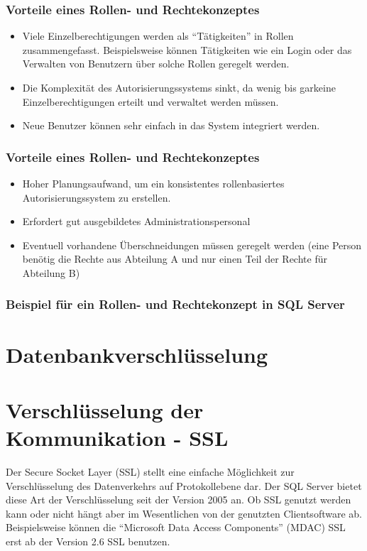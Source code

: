         \subsubsection{Vorteile eines Rollen- und Rechtekonzeptes}
          \begin{itemize}
            \item Viele Einzelberechtigungen werden als \enquote{Tätigkeiten} in
            Rollen zusammengefasst. Beispielsweise können Tätigkeiten wie ein
            Login oder das Verwalten von Benutzern über solche Rollen geregelt
            werden.
            \item Die Komplexität des Autorisierungssystems sinkt, da wenig bis
            garkeine Einzelberechtigungen erteilt und verwaltet werden müssen.
            \item Neue Benutzer können sehr einfach in das System integriert
            werden.
          \end{itemize}
        \subsubsection{Vorteile eines Rollen- und Rechtekonzeptes}
          \begin{itemize}
            \item Hoher Planungsaufwand, um ein konsistentes rollenbasiertes
            Autorisierungssystem zu erstellen.
            \item Erfordert gut ausgebildetes Administrationspersonal
            \item Eventuell vorhandene Überschneidungen müssen geregelt werden
            (eine Person benötig die Rechte aus Abteilung A und nur einen Teil
            der Rechte für Abteilung B)
          \end{itemize}
        \subsubsection{Beispiel für ein Rollen- und Rechtekonzept in SQL Server}
    \section{Datenbankverschlüsselung}
    \section{Verschlüsselung der Kommunikation - SSL}
      Der Secure Socket Layer (SSL) stellt eine einfache Möglichkeit zur
      Verschlüsselung des Datenverkehrs auf Protokollebene dar. Der SQL Server
      bietet diese Art der Verschlüsselung seit der Version 2005 an. Ob SSL
      genutzt werden kann oder nicht hängt aber im Wesentlichen von der
      genutzten Clientsoftware ab. Beispielsweise können die \enquote{Microsoft
      Data Access Components} (MDAC) SSL erst ab der Version 2.6 SSL benutzen.
      
